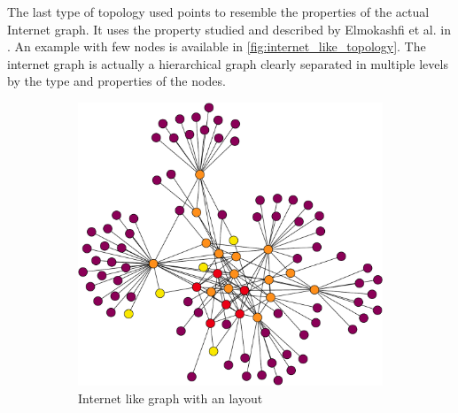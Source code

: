 The last type of topology used points to resemble the properties of the actual
Internet graph.
It uses the property studied and described by Elmokashfi et al. in \cite{elmokashfi2010scalability}.
An example with few nodes is available in \cref{fig:internet_like_topology}.
The internet graph is actually a hierarchical graph clearly separated in multiple
levels by the type and properties of the nodes.

\begin{figure}[ht]
     \centering
     \begin{subfigure}[b]{0.49\textwidth}
         \centering
         \includegraphics[width=\textwidth]{images/internet_graph/graph-100-colored.pdf}
		 \caption{Internet like graph with an  layout}
         \label{fig:internet_topology_explosive}
     \end{subfigure}
     \hfill
     \begin{subfigure}[b]{0.49\textwidth}
         \centering

\end{subfigure}
\end{figure}
